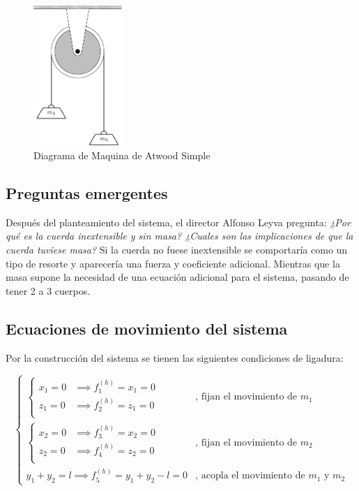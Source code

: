 \documentclass{article}
\theoremstyle{definition}
\begin{document}
\begin{figure}[htbp!]
	\centering
	\includegraphics[width=0.3\textwidth]{./Images/atwood-machine.pdf}
	\caption{Diagrama de Maquina de Atwood Simple}
	\label{fig:atwood_machine}
\end{figure}

\subsection{Preguntas emergentes}
Después del planteamiento del sistema, el director Alfonso Leyva pregunta: \emph{¿Por qué es la cuerda inextensible y sin masa? ¿Cuales son las implicaciones de que la cuerda tuviese masa?} Si la cuerda no fuese inextensible se comportaría como un tipo de resorte y aparecería una fuerza y coeficiente adicional. Mientras que la masa supone la necesidad de una ecuación adicional para el sistema, pasando de tener 2 a 3 cuerpos.

\subsection{Ecuaciones de movimiento del sistema}
Por la construcción del sistema se tienen las siguientes condiciones de ligadura:

\begin{equation}
	\begin{cases}
		\begin{cases}
			x_1 = 0 &\implies f_1^{(h)} = x_1 = 0 \\
			z_1 = 0 &\implies f_2^{(h)} = z_1 = 0 \\
		\end{cases} & \text{, fijan el movimiento de } m_1 \\
		\begin{cases}
			x_2 = 0 &\implies f_3^{(h)} = x_2 = 0 \\
			z_2 = 0 &\implies f_4^{(h)} = z_2 = 0 \\
		\end{cases} & \text{, fijan el movimiento de } m_2 \\
		y_1 + y_2 = l  \implies f_5^{(h)} = y_1 + y_2 - l = 0  & \text{, acopla el movimiento de $m_1$ y $m_2$}
	\end{cases}
\end{equation}
\end{document}
